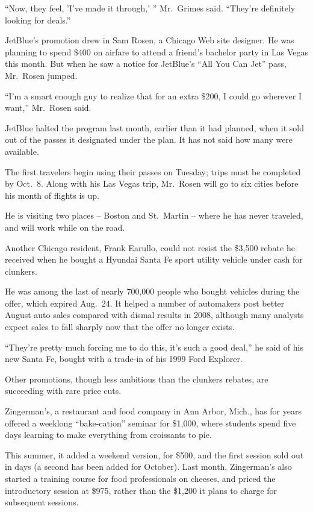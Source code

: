 ﻿\documentclass[12pt]{article}
\begin{document}
``Now, they feel, 'I've made it through,' '' Mr.~Grimes said. ``They're definitely looking for
deals.''

JetBlue's promotion drew in Sam Rosen, a Chicago Web site designer. He was planning to spend \$400
on airfare to attend a friend's bachelor party in Las Vegas this month. But when he saw a notice for
JetBlue's ``All You Can Jet'' pass, Mr.~Rosen jumped.

``I'm a smart enough guy to realize that for an extra \$200, I could go wherever I want,'' Mr.~Rosen
said.

JetBlue halted the program last month, earlier than it had planned, when it sold out of the passes
it designated under the plan. It has not said how many were available.

The first travelers begin using their passes on Tuesday; trips must be completed by Oct.~8. Along
with his Las Vegas trip, Mr.~Rosen will go to six cities before his month of flights is up.

He is visiting two places -- Boston and St.~Martin -- where he has never traveled, and will work
while on the road.

Another Chicago resident, Frank Earullo, could not resist the \$3,500 rebate he received when he
bought a Hyundai Santa Fe sport utility vehicle under cash for clunkers.

He was among the last of nearly 700,000 people who bought vehicles during the offer, which expired
Aug.~24. It helped a number of automakers post better August auto sales compared with dismal results
in 2008, although many analysts expect sales to fall sharply now that the offer no longer exists.

``They're pretty much forcing me to do this, it's such a good deal,'' he said of his new Santa Fe,
bought with a trade-in of his 1999 Ford Explorer.

Other promotions, though less ambitious than the clunkers rebates, are succeeding with rare price
cuts.

Zingerman's, a restaurant and food company in Ann Arbor, Mich., has for years offered a weeklong
``bake-cation'' seminar for \$1,000, where students spend five days learning to make everything from
croissants to pie.

This summer, it added a weekend version, for \$500, and the first session sold out in days (a second
has been added for October). Last month, Zingerman's also started a training course for food
professionals on cheeses, and priced the introductory session at \$975, rather than the \$1,200 it
plans to charge for subsequent sessions.
\end{document}
